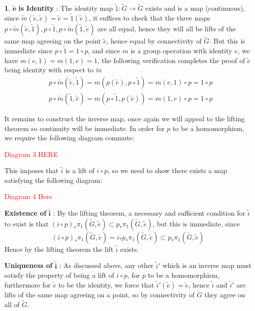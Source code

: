 \documentclass[10.5pt]{article}
\theoremstyle{definition}
\newtheorem{pb}{}
\begin{document}
\begin{pb}
        \(\mathbf{\tilde{e}}\) \textbf{is Identity} : The identity map \(\tilde{1}: \tilde{G} \to \tilde{G}\) exists and is a map (continuous), since \(\tilde{m}(\tilde{e},\tilde{e}) = \tilde{e} = \tilde{1}(\tilde{e})\), it suffices to check that the three maps \(p\circ\tilde{m}(\tilde{e},\tilde{1}), p\circ\tilde{1}, p\circ\tilde{m}(\tilde{1},\tilde{e})\) are all equal, hence they will all be lifts of the same map agreeing on the point \(\tilde{e}\), hence equal by connectivity of \(\tilde{G}\). But this is immediate since \(p\circ\tilde{1} = 1\circ p\), and since \(m\) is a group operation with identity \(e\), we have \(m(e,1) = m(1,e) = 1\), the following verification completes the proof of \(\tilde{e}\) being identity with respect to \(\tilde{m}\)
        \begin{align*}
            &p\circ\tilde{m}(\tilde{e},\tilde{1}) = m(p(\tilde{e}),p\circ \tilde{1}) = m(e,1)\circ p = 1 \circ p \\
            &p\circ\tilde{m}(\tilde{1},\tilde{e}) = m(p\circ \tilde{1},p(\tilde{e})) = m(1,e)\circ p = 1 \circ p
        \end{align*}

        It remains to construct the inverse map, once again we will appeal to the lifting theorem so continuity will be immediate. In order for \(p\) to be a homomorphism, we require the following diagram commute:
        
        \textcolor{red}{Diagram 3 HERE}

        This imposes that \(\tilde{i}\) is a lift of \(i \circ p\), so we need to show there exists a map satisfying the following diagram:

        \textcolor{red}{Diagram 4 Here}

        \textbf{Existence of }\(\mathbf{\tilde{i}}\) :
        By the lifting theorem, a necessary and sufficient condition for \(\tilde{i}\) to exist is that \((i \circ p)_* \pi_1(\tilde{G},\tilde{e}) \subset p_*\pi_1(\tilde{G},\tilde{e})\), but this is immediate, since
        \[(i \circ p)_* \pi_1(\tilde{G},\tilde{e}) = i_*p_*\pi_1(\tilde{G},\tilde{e}) \subset p_*\pi_1(\tilde{G},\tilde{e})\]
        Hence by the lifting theorem the lift \(\tilde{i}\) exists.

        \textbf{Uniqueness of }\(\mathbf{\tilde{i}}\) : As discussed above, any other \(\tilde{i}'\) which is an inverse map must satisfy the property of being a lift of \(i \circ p\), for \(p\) to be a homomorphism, furthermore for \(\tilde{e}\) to be the identity, we force that \(\tilde{i}'(\tilde{e}) = \tilde{e}\), hence \(\tilde{i}\) and \(\tilde{i}'\) are lifts of the same map agreeing on a point, so by connectivity of \(\tilde{G}\) they agree on all of \(\tilde{G}\).


\end{pb}
\end{document}
